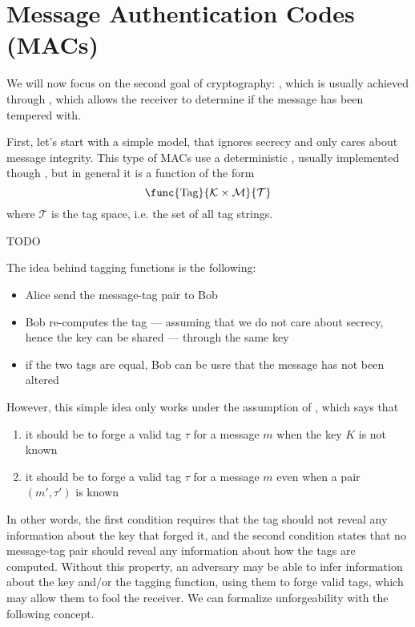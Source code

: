 \documentclass[a4paper, 12pt]{report}
\begin{document}
\section{Message Authentication Codes (MACs)}

We will now focus on the second goal of cryptography: , which is usually achieved through , which allows the receiver to determine if the message has been tempered with.

First, let's start with a simple model, that ignores secrecy and only cares about message integrity. This type of MACs use a deterministic , usually implemented though , but in general it is a function of the form $$\func{\mbox{Tag}}{\mathcal K \times \mathcal M}{\mathcal T}$$ where $\mathcal T$ is the tag space, i.e. the set of all tag strings.

TODO 

The idea behind tagging functions is the following:

\begin{itemize}
	\item Alice send the message-tag pair to Bob
	\item Bob re-computes the tag --- assuming that we do not care about secrecy, hence the key can be shared --- through the same key
	\item if the two tags are equal, Bob can be usre that the message has not been altered
\end{itemize}

However, this simple idea only works under the assumption of , which says that

\begin{enumerate}
	\item it should be  to forge a valid tag $\tau$ for a message $m$ when the key $K$ is not known
	\item it should be  to forge a valid tag $\tau$ for a message $m$ even when a pair $(m', \tau')$ is known
\end{enumerate}

In other words, the first condition requires that the tag should not reveal any information about the key that forged it, and the second condition states that no message-tag pair should reveal any information about how the tags are computed. Without this property, an adversary may be able to infer information about the key and/or the tagging function, using them to forge valid tags, which may allow them to fool the receiver. We can formalize unforgeability with the following concept.
\end{document}
